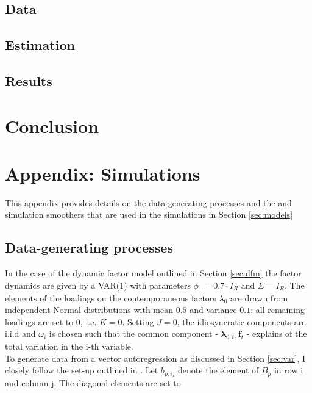\documentclass[notitlepage,a4paper,12pt]{article}
\begin{document}
\subsection{Data}

\subsection{Estimation}

\subsection{Results}

\section{Conclusion}




\appendix

\section{Appendix: Simulations}\label{app:simulation}

This appendix provides details on the data-generating processes and the \citet{carterkohn1994_biomtr} and \citet{durbinkoopman2002_biomtr} simulation smoothers that are used in the simulations in Section \ref{sec:models}

\subsection{Data-generating processes}

In the case of the dynamic factor model outlined in Section \ref{sec:dfm} the factor dynamics are given by a VAR(1) with parameters $\phi_1 = 0.7 \cdot I_R$ and $\Sigma = I_R$. The elements of the loadings on the contemporaneous factors $\lambda_0$ are drawn from independent Normal distributions with mean $0.5$ and variance $0.1$; all remaining loadings are set to 0, i.e. $K=0$. Setting $J=0$, the idiosyncratic components are i.i.d and $\omega_i$ is chosen such that the common component - $\boldsymbol{\lambda}_{0,i\cdot} \mathbf{f}_t$ - explains  of the total variation in the i-th variable. \\

To generate data from a vector autoregression as discussed in Section \ref{sec:var}, I closely follow the set-up outlined in \citet{CHP2020_ijf}. Let $b_{p, ij}$ denote the element of $B_p$ in row i and column j. The diagonal elements are set to
\end{document}
